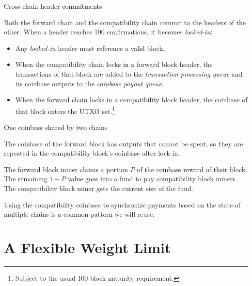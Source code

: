 \documentclass[10pt]{beamer}
\begin{document}
\begin{frame}{Cross-chain header commitments}

  Both the forward chain and the compatibility chain commit to the
  headers of the other.  When a header reaches \num{100}
  confirmations, it becomes \emph{locked-in}:

  \begin{itemize}

  \item Any \emph{locked-in} header must reference a valid block.

  \item When the compatibility chain locks in a forward block header,
    the transactions of that block are added to the \emph{transaction
      processing queue} and its coinbase outputs to the \emph{coinbase
      payout queue}.

  \item When the forward chain locks in a compatibility block header,
    the coinbase of that block enters the UTXO set.\footnote{Subject
      to the usual \num{100}-block maturity requirement.}

  \end{itemize}

\end{frame}

\begin{frame}{One coinbase shared by two chains}

  The coinbase of the forward block has outputs that cannot be spent,
  so they are repeated in the compatibility block's coinbase after
  lock-in.

  The forward block miner claims a portion $P$ of the coinbase reward
  of their block.  The remaining $1-P$ value goes into a fund to pay
  compatibility block miners.  The compatibility block miner gets
   the current size of the fund.

  Using the compatibility coinbase to synchronize payments based on
  the state of multiple chains is a common pattern we will reuse.

\end{frame}

\section{A Flexible Weight Limit}
\end{document}
